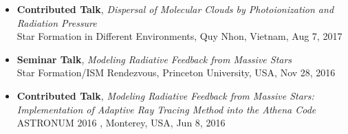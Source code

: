 \documentclass[11pt,letterpaper,roman]{moderncv}        %
\begin{document}
\begin{itemize}
\item \textbf{Contributed Talk}, \textit{Dispersal of Molecular Clouds by Photoionization
    and Radiation Pressure}\\ Star Formation in Different
  Environments, Quy Nhon, Vietnam, Aug 7, 2017
\item \textbf{Seminar Talk}, \textit{Modeling Radiative Feedback from Massive
    Stars}\\ Star Formation/ISM Rendezvous, Princeton University, USA,
  Nov 28, 2016
\item \textbf{Contributed Talk}, \textit{Modeling Radiative Feedback from Massive Stars:
    Implementation of Adaptive Ray Tracing Method into the Athena Code}\\
  ASTRONUM 2016
  , Monterey, USA, Jun 8, 2016

\end{itemize}
\end{document}
